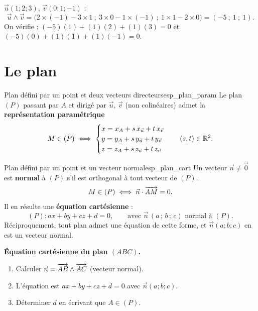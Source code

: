 \begin{exemple}
	$\vec u(1;2;3)$, $\vec v(0;1;-1)$ :
	$$
	\vec u \wedge \vec v =
	\bigl(2\times(-1) - 3\times1\ ;\ 3\times0 - 1\times(-1)\ ;\ 1\times1 - 2\times0\bigr)
	= (-5\ ;\ 1\ ;\ 1).
	$$
	On vérifie : $(-5)(1) + (1)(2) + (1)(3) = 0$ et $(-5)(0)+(1)(1)+(1)(-1) = 0$.
\end{exemple}


\section{Le plan}

\begin{propriete}{Plan défini par un point et deux vecteurs directeurs}{esp_plan_param}
	Le plan $(P)$ passant par $A$ et dirigé par $\vec u$, $\vec v$ (non
	colinéaires) admet la \textbf{représentation paramétrique}
	$$
	M \in (P) \iff
	\begin{cases}
		x = x_A + s\,x_{\vec u} + t\,x_{\vec v} \\
		y = y_A + s\,y_{\vec u} + t\,y_{\vec v} \\
		z = z_A + s\,z_{\vec u} + t\,z_{\vec v}
	\end{cases}
	\quad (s,t) \in \mathbb{R}^2.
	$$
\end{propriete}

\begin{propriete}{Plan défini par un point et un vecteur normal}{esp_plan_cart}
	Un vecteur $\vec n \neq \vec 0$ est \textbf{normal} à $(P)$ s'il est
	orthogonal à tout vecteur de $(P)$.
	$$
	M \in (P) \iff \vec n \cdot \overrightarrow{AM} = 0.
	$$
	Il en résulte une \textbf{équation cartésienne} :
	$$
	(P) : ax + by + cz + d = 0,
	\qquad \text{avec } \vec n\,(a\,;\,b\,;\,c) \text{ normal à } (P).
	$$
	Réciproquement, tout plan admet une équation de cette forme, et $\vec n(a;b;c)$
	en est un vecteur normal.
\end{propriete}

\begin{methode}
	\textbf{Équation cartésienne du plan $(ABC)$.}
	\begin{enumerate}
		\item Calculer $\vec n = \overrightarrow{AB} \wedge \overrightarrow{AC}$ (vecteur normal).
		\item L'équation est $a x + b y + c z + d = 0$ avec $\vec n(a;b;c)$.
		\item Déterminer $d$ en écrivant que $A \in (P)$.
	\end{enumerate}
\end{methode}

